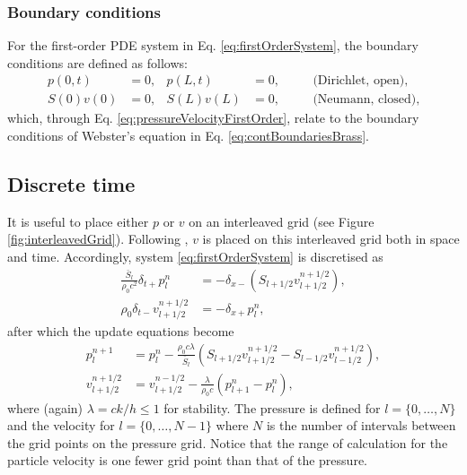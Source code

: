 {\subsubsection{Boundary conditions}
For the first-order PDE system in Eq. \eqref{eq:firstOrderSystem}, the boundary conditions are defined as follows:
\begin{subequations}
    \begin{align}\label{eq:firstOrderBoundaryConditionsCont}
        p(0,t) &= 0, &  p(L,t) &= 0, & &\quad\text{(Dirichlet, open)},\\
        S(0)v(0) &= 0, & S(L)v(L) &= 0, & &\quad \text{(Neumann, closed)},
    \end{align}
\end{subequations}
which, through Eq. \eqref{eq:pressureVelocityFirstOrder}, relate to the boundary conditions of Webster's equation in Eq. \eqref{eq:contBoundariesBrass}.

\subsection{Discrete time}\label{sec:firstOrderDiscrete}
It is useful to place either $p$ or $v$ on an interleaved grid (see Figure \ref{fig:interleavedGrid}). Following \cite{Harrison2018}, $v$ is placed on this interleaved grid both in space and time. 
Accordingly, system \eqref{eq:firstOrderSystem} is discretised as
\begin{subequations}\label{eq:firstOrderFDS}
    \begin{align}
        \frac{\bar S_l}{\rho_0 c^2}\delta_{t+}p_l^n &= -\delta_{x-}(S_{l+1/2}v_{l+1/2}^{n+1/2}),\label{eq:discPressure}\\
        \rho_0 \delta_{t-}v_{l+1/2}^{n+1/2}&=-\delta_{x+}p_l^n,\label{eq:discVelocity}
    \end{align}
\end{subequations}
after which the update equations become
\begin{subequations}
    \begin{align}
        p_l^{n+1} &= p_l^n - \frac{\rho_0 c \lambda}{\bar{S}_l}(S_{l+1/2}v_{l+1/2}^{n+1/2}-S_{l-1/2}v_{l-1/2}^{n+1/2}),\label{eq:pressureUpdate}\\
        v_{l+1/2}^{n+1/2} &= v_{l+1/2}^{n-1/2}-\frac{\lambda}{\rho_0 c}(p_{l+1}^n - p_l^n),\label{eq:velocityUpdate}
    \end{align}
\end{subequations}
where (again) $\lambda = ck/h \leq 1$ for stability. The pressure is defined for $l=\{0, \hdots, N\}$ and the velocity for $l=\{0, \hdots, N-1\}$ where $N$ is the number of intervals between the grid points on the pressure grid. Notice that the range of calculation for the particle velocity is one fewer grid point than that of the pressure.

}
